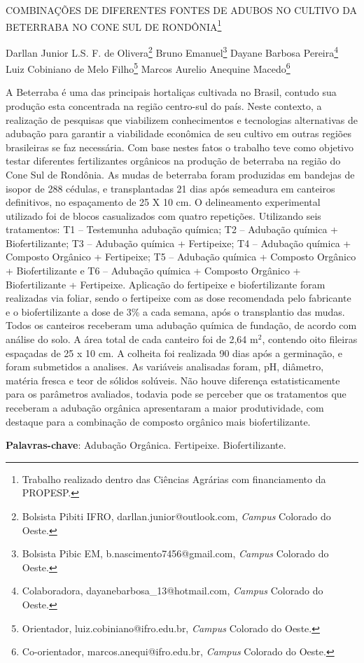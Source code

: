 \documentclass[article,12pt,onesidea,4paper,english,brazil]{abntex2}
\begin{document}
	
	
	\frenchspacing 
	
	\begin{center}
		\LARGE COMBINAÇÕES DE DIFERENTES FONTES DE ADUBOS NO CULTIVO DA
		BETERRABA NO CONE SUL DE RONDÔNIA\footnote{Trabalho realizado dentro das Ciências Agrárias com financiamento da PROPESP.}
		
		\normalsize
		Darllan Junior L.S. F. de Olivera\footnote{Bolsista Pibiti IFRO, darllan.junior@outlook.com, \textit{Campus} Colorado do Oeste.} 
		Bruno Emanuel\footnote{Bolsista Pibic EM, b.nascimento7456@gmail.com, \textit{Campus} Colorado do Oeste.} 
		Dayane Barbosa Pereira\footnote{Colaboradora, dayanebarbosa\_13@hotmail.com, \textit{Campus} Colorado do Oeste.} 
		Luiz Cobiniano de Melo Filho\footnote{Orientador, luiz.cobiniano@ifro.edu.br, \textit{Campus} Colorado do Oeste.}
		Marcos Aurelio Anequine Macedo\footnote{Co-orientador, marcos.anequi@ifro.edu.br, \textit{Campus} Colorado do Oeste.} 
	\end{center}
	
	\noindent A Beterraba é uma das principais hortaliças cultivada no Brasil, contudo sua
	produção esta concentrada na região centro-sul do país. Neste contexto, a
	realização de pesquisas que viabilizem conhecimentos e tecnologias alternativas de
	adubação para garantir a viabilidade econômica de seu cultivo em outras regiões
	brasileiras se faz necessária. Com base nestes fatos o trabalho teve como objetivo
	testar diferentes fertilizantes orgânicos na produção de beterraba na região do Cone
	Sul de Rondônia. As mudas de beterraba foram produzidas em bandejas de isopor
	de 288 cédulas, e transplantadas 21 dias após semeadura em canteiros definitivos,
	no espaçamento de 25 X 10 cm. O delineamento experimental utilizado foi de blocos
	casualizados com quatro repetições. Utilizando seis tratamentos: T1 – Testemunha
	adubação química; T2 – Adubação química + Biofertilizante; T3 – Adubação química
	+ Fertipeixe; T4 – Adubação química + Composto Orgânico + Fertipeixe; T5 –
	Adubação química + Composto Orgânico + Biofertilizante e T6 – Adubação química +
	Composto Orgânico + Biofertilizante + Fertipeixe. Aplicação do fertipeixe e
	biofertilizante foram realizadas via foliar, sendo o fertipeixe com as dose
	recomendada pelo fabricante e o biofertilizante a dose de 3\% a cada semana, após
	o transplantio das mudas. Todos os canteiros receberam uma adubação química de
	fundação, de acordo com análise do solo. A área total de cada canteiro foi de 2,64
	m$^2$, contendo oito fileiras espaçadas de 25 x 10 cm. A colheita foi realizada 90 dias
	após a germinação, e foram submetidos a analises. As variáveis analisadas foram,
	pH, diâmetro, matéria fresca e teor de sólidos solúveis. Não houve diferença
	estatisticamente para os parâmetros avaliados, todavia pode se perceber que os
	tratamentos que receberam a adubação orgânica apresentaram a maior
	produtividade, com destaque para a combinação de composto orgânico mais
	biofertilizante.
	
	\vspace{\onelineskip}
	
	\noindent
	\textbf{Palavras-chave}: Adubação Orgânica. Fertipeixe. Biofertilizante.
	
\end{document}
